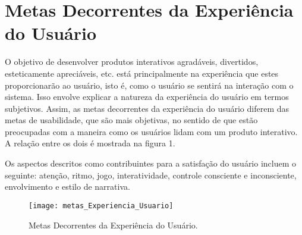 \chapter[Metas Decorrentes da Experiência do Usuário]{Metas Decorrentes da Experiência do Usuário}
	\label{sec:metasExperienciaUsuario}

	O objetivo de desenvolver produtos interativos agradáveis, divertidos, esteticamente apreciáveis, etc. está principalmente na experiência que estes proporcionarão ao usuário, isto é, como o usuário se sentirá na interação com o sistema. Isso envolve explicar a natureza da experiência do usuário em termos subjetivos. Assim, as metas decorrentes da experiência do usuário diferem das metas de usabilidade, que são mais objetivas, no sentido de que estão preocupadas com a maneira como os usuários lidam com um produto interativo. A relação entre os dois é mostrada na figura 1. 

	Os aspectos descritos como contribuintes para a satisfação do usuário incluem o seguinte: atenção, ritmo, jogo, interatividade, controle consciente e inconsciente, envolvimento e estilo de narrativa.

	\begin{figure}[h]
		\centering
		\texttt{[image: metas\_Experiencia\_Usuario]}
		\caption[Metas Decorrentes da Experiência do Usuário]{Metas Decorrentes da Experiência do Usuário.}
		\label{fig:metas_Experiencia_Usuario}
	\end{figure}